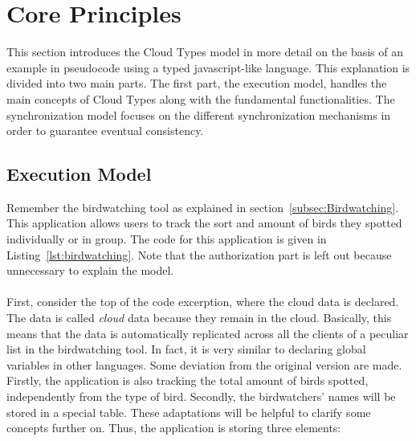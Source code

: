 \documentclass[a4paper,12pt]{report}
\begin{document}
\section{Core Principles}\label{sec:CorePrinciples}

This section introduces the Cloud Types model in more detail on the basis of an example in pseudocode using a typed javascript-like language. This explanation is divided into two main parts. The first part, the execution model, handles the main concepts of Cloud Types along with the fundamental functionalities. The synchronization model focuses on the different synchronization mechanisms in order to guarantee eventual consistency.

\begin{figure}
\begin{minipage}[t]{\textwidth}
\vspace{-3cm}

\end{minipage}
\end{figure}

\subsection{Execution Model}\label{subsec:ExecutionModel}

Remember the birdwatching tool as explained in section~\ref{subsec:Birdwatching}. This application allows users to track the sort and amount of birds they spotted individually or in group. The code for this application is given in Listing~\ref{lst:birdwatching}. Note that the authorization part is left out because unnecessary to explain the model. \\
\\
First, consider the top of the code excerption, where the cloud data is declared. The data is called \textit{cloud} data because they remain in the cloud. Basically, this means that the data is automatically replicated across all the clients of a peculiar list in the birdwatching tool. In fact, it is very similar to declaring global variables in other languages. Some deviation from the original version are made. Firstly, the application is also tracking the total amount of birds spotted, independently from the type of bird. Secondly, the birdwatchers' names will be stored in a special table. These adaptations will be helpful to clarify some concepts further on. Thus, the application is storing three elements:
\end{document}
